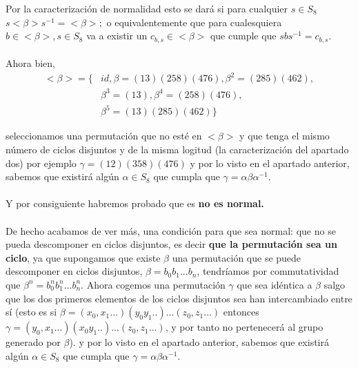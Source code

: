 \documentclass[12pt]{article}
\begin{document}
Por la caracterización de normalidad esto se dará si para cualquier $s \in S_8$
$s <\beta> s^{-1} = <\beta>;$ o equivalentemente que para cualesquiera $b \in <\beta>, s \in S_8$ va a existir 
un $c_{b,s} \in <\beta>$  que cumple que $s bs^{-1} = c_{b,s}.$
\paragraph{}
Ahora bien, 
\begin{equation*}
\begin{split}
<\beta> = \{ &id,\beta = (1 3) (2 5 8) (4 7 6), \beta ^2 =(2 8 5)(4 6 2), \\
 & \beta ^3 =(1 3), \beta ^4 = (2 5 8) (4 7 6),  \\
& \beta^5 = (1 3)(2 8 5)(4 6 2)\}
\end{split}
\end{equation*}

seleccionamos una permutación que no esté en $<\beta>$ y que tenga el mismo número de ciclos disjuntos y de la misma logitud (la caracterización del apartado dos) 
por ejemplo $\gamma = (1 2)(3 5 8)(4 7 6)$ 
y por lo visto en el apartado anterior, sabemos que existirá algún $\alpha \in S_8$ que cumpla que $\gamma = \alpha \beta \alpha^{-1}.$
\paragraph{}
Y por consiguiente habremos probado que es \textbf{no es normal.}

\paragraph{}
 De hecho acabamos de ver más, una condición para que sea normal: 
que no se pueda descomponer en ciclos disjuntos, es decir \textbf{que la permutación sea un ciclo}, 
ya que supongamos que existe $\beta$ una permutación que se puede descomponer en ciclos disjuntos, 
$\beta = b_0 b_1...b_n$, tendríamos por commutatividad que 
$\beta ^n = b_0^n b_1^n...b_n^n$. Ahora cogemos una permutación $\gamma$ que sea idéntica a $\beta$ salgo que los dos primeros elementos
de los ciclos disjuntos sea han intercambiado entre sí (esto es si $\beta = (x_0,x_1...)(y_0 y_1..)...(z_0,z_1...)$ entonces $\gamma =(y_0,x_1...)(x_0 y_1..)...(z_0,z_1...)$,
y por tanto no pertenecerá al grupo generado por $\beta$). 
y por lo visto en el apartado anterior, sabemos que existirá algún $\alpha \in S_8$ que cumpla que $\gamma = \alpha \beta \alpha^{-1}.$
\end{document}
